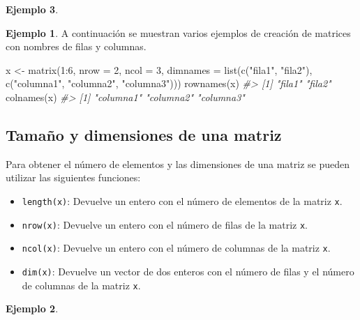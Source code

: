 \documentclass[
]{book}
\newenvironment{Shaded}{\begin{snugshade}}{\end{snugshade}}
\newcommand{\AttributeTok}[1]{\textcolor[rgb]{0.77,0.63,0.00}{#1}}
\newcommand{\CommentTok}[1]{\textcolor[rgb]{0.56,0.35,0.01}{\textit{#1}}}
\newcommand{\DecValTok}[1]{\textcolor[rgb]{0.00,0.00,0.81}{#1}}
\newcommand{\FunctionTok}[1]{\textcolor[rgb]{0.00,0.00,0.00}{#1}}
\newcommand{\NormalTok}[1]{#1}
\newcommand{\OtherTok}[1]{\textcolor[rgb]{0.56,0.35,0.01}{#1}}
\newcommand{\SpecialCharTok}[1]{\textcolor[rgb]{0.00,0.00,0.00}{#1}}
\newcommand{\StringTok}[1]{\textcolor[rgb]{0.31,0.60,0.02}{#1}}
\providecommand{\tightlist}{%
  \setlength{\itemsep}{0pt}\setlength{\parskip}{0pt}}
\theoremstyle{definition}
\theoremstyle{definition}
\newtheorem{example}{Ejemplo}[chapter]
\theoremstyle{definition}
\theoremstyle{definition}
\theoremstyle{remark}
\begin{document}
\begin{example}
\begin{example}

A continuación se muestran varios ejemplos de creación de matrices con nombres de filas y columnas.

\begin{Shaded}
\begin{Highlighting}[]
\NormalTok{x }\OtherTok{\textless{}{-}} \FunctionTok{matrix}\NormalTok{(}\DecValTok{1}\SpecialCharTok{:}\DecValTok{6}\NormalTok{, }\AttributeTok{nrow =} \DecValTok{2}\NormalTok{, }\AttributeTok{ncol =} \DecValTok{3}\NormalTok{, }\AttributeTok{dimnames =} \FunctionTok{list}\NormalTok{(}\FunctionTok{c}\NormalTok{(}\StringTok{"fila1"}\NormalTok{, }\StringTok{"fila2"}\NormalTok{), }\FunctionTok{c}\NormalTok{(}\StringTok{"columna1"}\NormalTok{, }\StringTok{"columna2"}\NormalTok{, }\StringTok{"columna3"}\NormalTok{)))}
\FunctionTok{rownames}\NormalTok{(x)}
\CommentTok{\#\textgreater{} [1] "fila1" "fila2"}
\FunctionTok{colnames}\NormalTok{(x)}
\CommentTok{\#\textgreater{} [1] "columna1" "columna2" "columna3"}
\end{Highlighting}
\end{Shaded}

\end{example}

\hypertarget{tamauxf1o-y-dimensiones-de-una-matriz}{%
\subsection{Tamaño y dimensiones de una matriz}\label{tamauxf1o-y-dimensiones-de-una-matriz}}

Para obtener el número de elementos y las dimensiones de una matriz se pueden utilizar las siguientes funciones:

\begin{itemize}
\tightlist
\item
  \texttt{length(x)}: Devuelve un entero con el número de elementos de la matriz \texttt{x}.
\item
  \texttt{nrow(x)}: Devuelve un entero con el número de filas de la matriz \texttt{x}.
\item
  \texttt{ncol(x)}: Devuelve un entero con el número de columnas de la matriz \texttt{x}.
\item
  \texttt{dim(x)}: Devuelve un vector de dos enteros con el número de filas y el número de columnas de la matriz \texttt{x}.
\end{itemize}

\begin{example}


\end{example}
\end{example}
\end{document}
